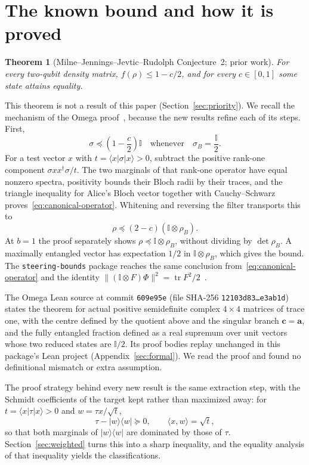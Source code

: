 \documentclass[11pt,a4paper]{article}
\newtheorem{theorem}{Theorem}[section]
\theoremstyle{remark}\newtheorem{remark}[theorem]{Remark}
\DeclareMathOperator{\tr}{tr}\DeclareMathOperator{\diag}{diag}\DeclareMathOperator{\spec}{spec}
\newcommand{\ket}[1]{\lvert #1\rangle}\newcommand{\bra}[1]{\langle #1\rvert}
\newcommand{\ip}[2]{\langle #1,#2\rangle}\newcommand{\C}{\mathbb C}\newcommand{\R}{\mathbb R}
\newcommand{\Id}{\mathbb I}\newcommand{\HH}{\mathcal H}
\begin{document}
\section{The known bound and how it is proved}\label{sec:known}
\begin{theorem}[Milne--Jennings--Jevtic--Rudolph Conjecture~2; prior work]
For every two-qubit density matrix, $f(\rho)\le1-c/2$, and for every
$c\in[0,1]$ some state attains equality.
\end{theorem}
This theorem is not a result of this paper (Section~\ref{sec:priority}). We
recall the mechanism of the Omega proof~\cite{publicproof}, because the new
results refine each of its steps. First,
\begin{equation}\label{eq:canonical-operator}
 \sigma\preceq\left(1-\frac c2\right)\Id
 \quad\text{whenever}\quad\sigma_B=\frac{\Id}{2}.
\end{equation}
For a test vector $x$ with $t=\bra x\sigma\ket x>0$, subtract the positive
rank-one component $\sigma xx^\dagger\sigma/t$. The two marginals of that
rank-one operator have equal nonzero spectra, positivity bounds their Bloch
radii by their traces, and the triangle inequality for Alice's Bloch vector
together with Cauchy--Schwarz proves~\eqref{eq:canonical-operator}.
Whitening and reversing the filter transports this to
\begin{equation}\label{eq:public-operator}
 \rho\preceq(2-c)(\Id\otimes\rho_B).
\end{equation}
At $b=1$ the proof separately shows $\rho\preceq\Id\otimes\rho_B$, without
dividing by $\det\rho_B$. A maximally entangled vector has expectation $1/2$
in $\Id\otimes\rho_B$, which gives the bound. The \texttt{steering-bounds}
package reaches the same conclusion from~\eqref{eq:canonical-operator} and
the identity $\|(\Id\otimes F)\Phi\|^2=\tr F^2/2$~\cite{steeringbounds}.

The Omega Lean source at commit \texttt{609e95e} (file SHA-256
\texttt{12103d83\ldots e3ab1d}) states the theorem for actual positive
semidefinite complex $4\times4$ matrices of trace one, with the centre
defined by the quotient above and the singular branch $\bm c=\bm a$, and the
fully entangled fraction defined as a real supremum over unit vectors whose
two reduced states are $\Id/2$. Its proof bodies replay unchanged in this
package's Lean project (Appendix~\ref{sec:formal}). We read the proof and
found no definitional mismatch or extra assumption.

The proof strategy behind every new result is the same extraction step,
with the Schmidt coefficients of the target kept rather than maximized away:
for $t=\bra x\tau\ket x>0$ and $w=\tau x/\sqrt t$,
\[
 \tau-\ket w\bra w\succeq0,\qquad\ip xw=\sqrt t,
\]
so that both marginals of $\ket w\bra w$ are dominated by those of $\tau$.
Section~\ref{sec:weighted} turns this into a sharp inequality, and the
equality analysis of that inequality yields the classifications.
\end{document}
